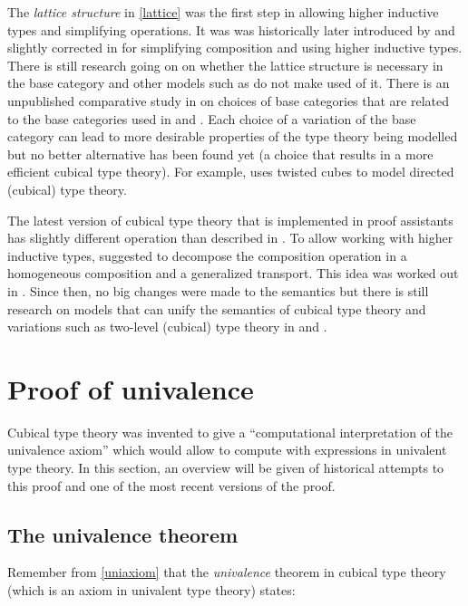 \documentclass[12pt,a4paper,twoside,xetex]{book} %
\newcommand{\keyword}[1]{\emph{#1}\index{#1}}
\begin{document}
The \keyword{lattice structure} in  \cref{lattice} was the first step in allowing higher inductive types and simplifying operations. It was  was historically 
later introduced by \cite{Cohen2016} and slightly corrected in \cite{Huber2016} for simplifying composition and using 
higher inductive types. There is still research going on on whether the lattice structure is necessary in the base category and other models such as \cite{Altenkirch2015} do not make used of it.
There is an unpublished comparative study in \cite{Awodey2016June} on choices of base categories that are related to the base categories used in \cite{Bezem2014} and \cite{Huber2016}. Each choice of a variation of the base category can lead to more desirable properties of the type theory being modelled but no better alternative has been found yet (a choice that results in a more efficient cubical type theory). For example, \cite{Gun2019} uses twisted cubes to model directed (cubical) type theory.

The latest version of cubical type theory that is implemented in proof assistants has slightly different operation than described in \cite{Huber2016}. To allow working with higher inductive types, \cite{Huber17note} suggested to decompose the composition operation in a homogeneous composition and a generalized transport. This idea was worked out in \cite{Coquand2018}. Since then, no big changes were made to the semantics but there is still research on models that can unify the semantics of cubical type theory and variations such as two-level (cubical) type theory in \cite{Uem19} and \cite{Cavallo2019}. 


\chapter{Proof of univalence}\label{univalenceproof}

Cubical type theory was invented to give a ``computational interpretation of 
the univalence axiom'' which would allow to compute with expressions in 
univalent type theory. In this section, an overview will be given of 
historical attempts to this proof and one of the most recent versions of the 
proof.


\section{The univalence theorem}

Remember from \cref{uniaxiom} that the \keyword{univalence} theorem in cubical 
type theory (which is an axiom in univalent type theory) states:
\end{document}
